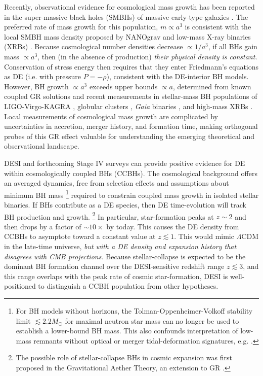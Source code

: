 \documentclass[a4paper,11pt]{article}
\begin{document}
Recently, observational evidence for cosmological mass growth has been reported in the super-massive black holes (SMBHs) of massive early-type galaxies \cite{Farrah23a, Farrah23b}.
The preferred rate of mass growth for this population, $m \propto a^3$ \cite{Farrah23b} is consistent with the local SMBH mass density proposed by NANOgrav \cite{Lacy23} and low-mass X-ray binaries (XRBs) \cite{GaoLi23}.
Because cosmological number densities decrease $\propto 1/a^3$, if all BHs gain mass $\propto a^3$, then (in the absence of production) \emph{their physical density is constant.}
Conservation of stress energy then requires that they enter Friedmann's equations as DE (i.e. with pressure $P = -\rho$), consistent with the DE-interior BH models.
However, BH growth $\propto a^3$ exceeds upper bounds $\propto a$, determined from known coupled GR solutions and recent measurements in stellar-mass BH populations of LIGO-Virgo-KAGRA \cite{CrokerNishimura20, CrokerZevin21, Ghodla23, Amendola24}, globular clusters \cite{Rodriguez23}, \emph{Gaia} binaries \cite{AndraeElBadry23}, and high-mass XRBs \cite{MlinarZwitter24}.
Local measurements of cosmological mass growth are complicated by uncertainties in accretion, merger history, and formation time, making orthogonal probes of this GR effect valuable for understanding the emerging theoretical and observational landscape. 

DESI and forthcoming Stage IV surveys \cite{LSSTDarkEnergyScience:2018jkl, LSSTDarkEnergyScience:2018yem, LSST:2008ijt, Euclid:2019clj, Amendola:2016saw, Akeson:2019biv, Dore:2019pld,SKA:2018ckk} can provide positive evidence for DE within cosmologically coupled BHs (CCBHs).
The cosmological background offers an averaged dynamics, free from selection effects and assumptions about minimum BH mass%
\footnote{For BH models without horizons, the Tolman-Oppenheimer-Volkoff stability limit $\lesssim 2.2M_\odot$ for maximal neutron star mass can no longer be used to establish a lower-bound BH mass.
This also confounds interpretation of low-mass remnants without  optical or merger tidal-deformation signatures, e.g. \cite{ZevinLed_GW230529}.} 
required to constrain coupled mass growth in isolated stellar binaries.
If BHs contribute as a DE species, then DE time-evolution will track BH production and growth.%
\footnote{The possible role of stellar-collapse BHs in cosmic expansion was first proposed in the Gravitational Aether Theory, an extension to GR \cite{2008arXiv0807.2639A, Prescod-Weinstein2009}.}
In particular, star-formation peaks at $z \sim 2$ \cite{MadauDickinson2014, madaufragos2017} and then drops by a factor of $\sim 10\times$ by today.
This causes the DE density from CCBHs to asymptote toward a constant value at $z \lesssim 1$.
This would mimic $\Lambda$CDM in the late-time universe, \emph{but with a DE density and expansion history that disagrees with CMB projections.}
Because stellar-collapse is expected to be the dominant BH formation channel over the DESI-sensitive redshift range $z \lesssim 3$, and this range overlaps with the peak rate of cosmic star-formation, DESI is well-positioned to distinguish a CCBH population from other hypotheses.
\end{document}
